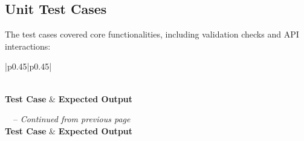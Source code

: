 \documentclass[12pt, titlepage]{article}
\begin{document}
\subsection{Unit Test Cases}
The test cases covered core functionalities, including validation checks and API interactions:

\begin{longtable}{|p{}|p{}|}
  \caption{Sample Unit Test Cases} \label{tab:sample_tests} \\
  \hline
  \textbf{Test Case} & \textbf{Expected Output} \\
  \hline
  \endfirsthead
  
  {\tablename\ \thetable\ -- \textit{Continued from previous page}} \\
  \hline
  \textbf{Test Case} & \textbf{Expected Output} \\
  \hline
  \endhead
  
  \hline {} \\
  \endfoot
  
  \hline
  \endlastfoot
  

\end{longtable}
\end{document}
